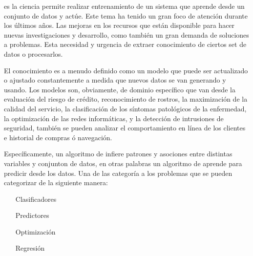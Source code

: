 

\machinelearning es la ciencia permite realizar entrenamiento de un sistema que aprende desde un conjunto de datos y actúe. Este tema ha tenido un gran foco de atención durante los últimos años. Las mejoras en los recursos que están disponible para hacer nuevas investigaciones y desarrollo, como también un gran demanda de soluciones a problemas. Esta necesidad  y urgencia de extraer conocimiento de ciertos set de datos o procesarlos.

El conocimiento es a menudo definido como un modelo que puede ser actualizado o ajustado constantemente a medida que nuevos datos se van generando y usando.
Los modelos son, obviamente, de dominio específico que van desde la evaluación del riesgo de crédito, reconocimiento de rostros, la maximización de la calidad del servicio, la clasificación de los síntomas patológicos de la enfermedad, la optimización de las redes informáticas, y la detección de intrusiones de seguridad, también se pueden analizar el comportamiento en línea de los clientes e historial de compras ó navegación.

Específicamente, un algoritmo de \machinelearning infiere patrones y asociones entre distintas variables y conjunton de datos, en otras palabras un algoritmo de \machinelearning aprende para predicir desde los datos. Una de las categoría a los problemas que se pueden categorizar de la siguiente manera:

\begin{itemize}
	
	\item[Clasificadores]	
		

	\item[Predictores]		
		

	\item[Optimización]	
		

	\item[Regresión]
		

\end{itemize}



